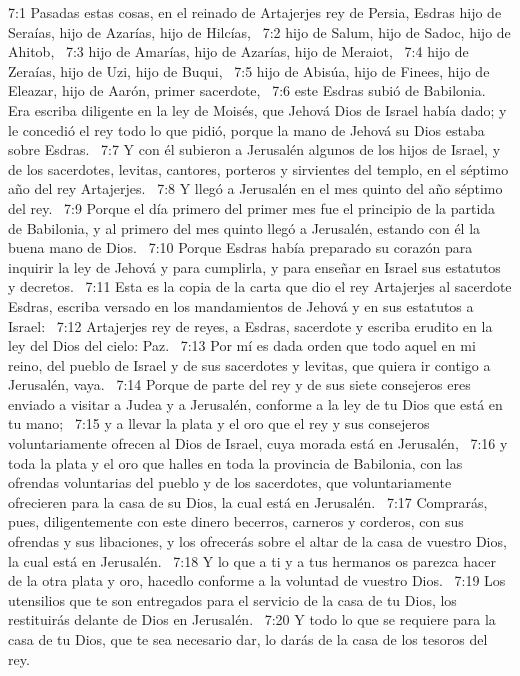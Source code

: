 7:1 Pasadas estas cosas, en el reinado de Artajerjes rey de Persia, Esdras hijo de Seraías, hijo de Azarías, hijo de Hilcías,  
7:2 hijo de Salum, hijo de Sadoc, hijo de Ahitob,  
7:3 hijo de Amarías, hijo de Azarías, hijo de Meraiot,  
7:4 hijo de Zeraías, hijo de Uzi, hijo de Buqui,  
7:5 hijo de Abisúa, hijo de Finees, hijo de Eleazar, hijo de Aarón, primer sacerdote,  
7:6 este Esdras subió de Babilonia. Era escriba diligente en la ley de Moisés, que Jehová Dios de Israel había dado; y le concedió el rey todo lo que pidió, porque la mano de Jehová su Dios estaba sobre Esdras.  
7:7 Y con él subieron a Jerusalén algunos de los hijos de Israel, y de los sacerdotes, levitas, cantores, porteros y sirvientes del templo, en el séptimo año del rey Artajerjes.  
7:8 Y llegó a Jerusalén en el mes quinto del año séptimo del rey.  
7:9 Porque el día primero del primer mes fue el principio de la partida de Babilonia, y al primero del mes quinto llegó a Jerusalén, estando con él la buena mano de Dios.  
7:10 Porque Esdras había preparado su corazón para inquirir la ley de Jehová y para cumplirla, y para enseñar en Israel sus estatutos y decretos.  
7:11 Esta es la copia de la carta que dio el rey Artajerjes al sacerdote Esdras, escriba versado en los mandamientos de Jehová y en sus estatutos a Israel:  
7:12 Artajerjes rey de reyes, a Esdras, sacerdote y escriba erudito en la ley del Dios del cielo: Paz.  
7:13 Por mí es dada orden que todo aquel en mi reino, del pueblo de Israel y de sus sacerdotes y levitas, que quiera ir contigo a Jerusalén, vaya.  
7:14 Porque de parte del rey y de sus siete consejeros eres enviado a visitar a Judea y a Jerusalén, conforme a la ley de tu Dios que está en tu mano;  
7:15 y a llevar la plata y el oro que el rey y sus consejeros voluntariamente ofrecen al Dios de Israel, cuya morada está en Jerusalén,  
7:16 y toda la plata y el oro que halles en toda la provincia de Babilonia, con las ofrendas voluntarias del pueblo y de los sacerdotes, que voluntariamente ofrecieren para la casa de su Dios, la cual está en Jerusalén.  
7:17 Comprarás, pues, diligentemente con este dinero becerros, carneros y corderos, con sus ofrendas y sus libaciones, y los ofrecerás sobre el altar de la casa de vuestro Dios, la cual está en Jerusalén.  
7:18 Y lo que a ti y a tus hermanos os parezca hacer de la otra plata y oro, hacedlo conforme a la voluntad de vuestro Dios.  
7:19 Los utensilios que te son entregados para el servicio de la casa de tu Dios, los restituirás delante de Dios en Jerusalén.  
7:20 Y todo lo que se requiere para la casa de tu Dios, que te sea necesario dar, lo darás de la casa de los tesoros del rey.  
